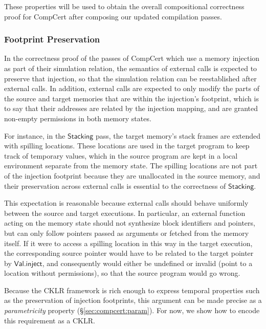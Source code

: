 \documentclass[acmsmall,timestamp,review,anonymous]{acmart}
\newcommand{\kw}[1]{\ensuremath{ \mathsf{#1} }}
\begin{document}
These properties will be used to obtain the overall
compositional correctness proof for CompCert
after composing our updated compilation passes.


\subsubsection{Footprint Preservation}

In the correctness proof of the passes of CompCert
which use a memory injection as part of their simulation relation,
the semantics of external calls is expected to preserve that injection,
so that the simulation relation can be reestablished
after external calls.
In addition,
external calls are expected to only modify
the parts of the source and target memories
that are within the injection's footprint,
which is to say that their addresses are
related by the injection mapping,
and are granted non-empty permissions
in both memory states.

For instance,
in the \kw{Stacking} pass,
the target memory's stack frames
are extended with spilling locations.
These locations are used in the target program
to keep track of temporary values,
which in the source program are kept
in a local environment separate from the memory state.
The spilling locations are not part of
the injection footprint
because they are unallocated in the source memory,
and their preservation across external calls
is essential to the correctness of \kw{Stacking}.

This expectation is reasonable because
external calls
should behave uniformly between the source and target executions.
In particular,
an external function acting on the memory state
should not synthesize block identifiers and pointers,
but can only follow pointers passed as arguments
or fetched from the memory itself.
If it were to access a spilling location in this way in the target execution,
the corresponding source pointer would have to be
related to the target pointer by \kw{Val.inject},
and consequently would either be undefined
or invalid (point to a location without permissions),
so that the source program would go wrong.

Because the CKLR framework is rich enough to express
temporal properties such as the preservation of injection footprints,
this argument can be made precise as a \emph{parametricity} property
(\S\ref{sec:compcert:param}).
For now,
we show how to encode this requirement as a CKLR.
\end{document}
